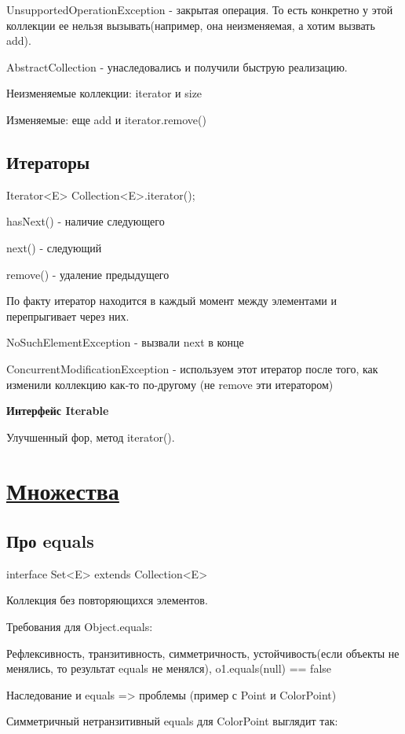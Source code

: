 \documentclass{article}
\begin{document}
UnsupportedOperationException - закрытая операция. То есть конкретно у этой коллекции ее нельзя вызывать(например, она неизменяемая, а хотим вызвать add).

AbstractCollection - унаследовались и получили быструю реализацию.

Неизменяемые коллекции: iterator и size

Изменяемые: еще add и iterator.remove()

\subsection{Итераторы}

Iterator<E> Collection<E>.iterator();

hasNext() - наличие следующего

next() - следующий

remove() - удаление предыдущего

По факту итератор находится в каждый момент между элементами и перепрыгивает через них.

NoSuchElementException - вызвали next в конце

ConcurrentModificationException - используем этот итератор после того, как изменили коллекцию как-то по-другому (не remove эти итератором)

\textbf{Интерфейс Iterable}

Улучшенный фор, метод iterator().

\section{\underline{Множества}}

\subsection{Про equals}

interface Set<E> extends Collection<E>

Коллекция без повторяющихся элементов.

Требования для Object.equals: 

Рефлексивность, транзитивность, симметричность, устойчивость(если объекты не менялись, то результат equals не менялся), o1.equals(null) == false

Наследование и equals => проблемы (пример с Point и ColorPoint)

Симметричный нетранзитивный equals для ColorPoint выглядит так:
\end{document}
